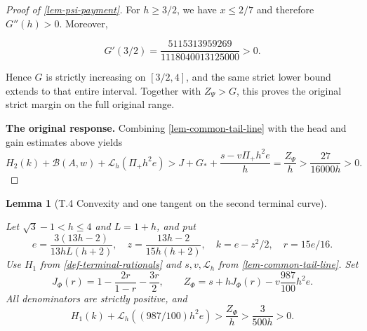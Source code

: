 \documentclass[11pt,a4paper]{article}
\theoremstyle{proofmanuscript}
\newtheorem{lemma}[theorem]{Lemma}
\begin{document}
\begin{proof}[Proof of \ref{lem-psi-payment}]
For \(h\ge3/2\), we have \(x\le2/7\) and therefore \(G''(h)>0\). Moreover,

\[
G'(3/2)=\frac{5115313959269}{1118040013125000}>0.
\]

Hence \(G\) is strictly increasing on \([3/2,4]\), and the same strict lower bound extends to that entire interval. Together with \(Z_\Psi>G\), this proves the original strict margin on the full original range.

\textbf{The original response.} Combining \ref{lem-common-tail-line} with the head and gain estimates above yields \[
H_2(k)+\mathcal B(A,w)+\mathcal L_h(\Pi_+h^2e)
>J+G_*+\frac{s-v\Pi_+h^2e}{h}=\frac{Z_\Psi}{h}>\frac{27}{16000h}>0.
\]

\end{proof}

\begin{lemma}[T.4 Convexity and one tangent on the second terminal curve]\label{lem-phi-payment}

Let \(\sqrt3-1<h\le4\) and \(L=1+h\), and put \[
e=\frac{3(13h-2)}{13hL(h+2)},\quad
z=\frac{13h-2}{15h(h+2)},\quad k=e-z^2/2,\quad r=15e/16.
\] Use \(H_1\) from \ref{def-terminal-rationals} and \(s,v,\mathcal L_h\) from \ref{lem-common-tail-line}. Set \[
J_\Phi(r)=1-\frac{2r}{1-r}-\frac{3r}{2},\qquad
Z_\Phi=s+hJ_\Phi(r)-v\frac{987}{100}h^2e.
\] All denominators are strictly positive, and \[
H_1(k)+\mathcal L_h((987/100)h^2e)>\frac{Z_\Phi}{h}>\frac{3}{500h}>0.
\]

\end{lemma}
\end{document}
